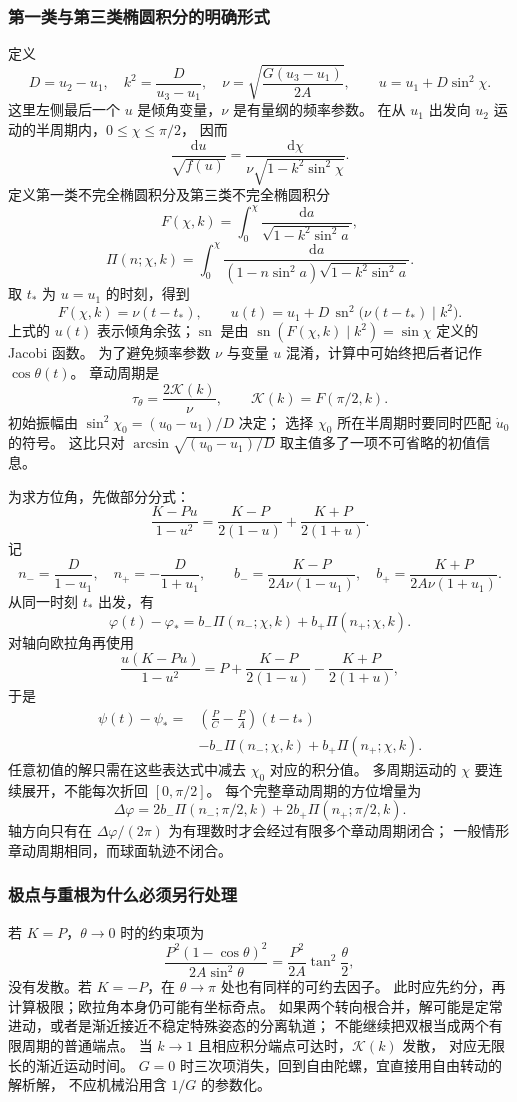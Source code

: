 \documentclass[UTF8,zihao=-4,fontset=fandol,a4paper]{ctexart}
\newcommand{\dd}{\mathrm d}
\begin{document}
\subsubsection*{第一类与第三类椭圆积分的明确形式}
定义
\[
D=u_2-u_1,\quad k^2=\frac{D}{u_3-u_1},\quad
\nu=\sqrt{\frac{G(u_3-u_1)}{2A}},\qquad
u=u_1+D\sin^2\chi.
\]
这里左侧最后一个 $u$ 是倾角变量，$\nu$ 是有量纲的频率参数。
在从 $u_1$ 出发向 $u_2$ 运动的半周期内，$0\le\chi\le\pi/2$，
因而
\[
\frac{\dd u}{\sqrt{f(u)}}
=\frac{\dd\chi}{\nu\sqrt{1-k^2\sin^2\chi}}.
\]
定义第一类不完全椭圆积分及第三类不完全椭圆积分
\[
F(\chi,k)=\int_0^\chi\frac{\dd a}{\sqrt{1-k^2\sin^2a}},
\]
\[
\Pi(n;\chi,k)=\int_0^\chi
\frac{\dd a}{(1-n\sin^2a)\sqrt{1-k^2\sin^2a}}.
\]
取 $t_*$ 为 $u=u_1$ 的时刻，得到
\[
F(\chi,k)=\nu(t-t_*),\qquad
u(t)=u_1+D\,\operatorname{sn}^2\bigl(\nu(t-t_*)\mid k^2\bigr).
\]
上式的 $u(t)$ 表示倾角余弦；$\operatorname{sn}$ 是由
$\operatorname{sn}(F(\chi,k)\mid k^2)=\sin\chi$ 定义的 Jacobi 函数。
为了避免频率参数 $\nu$ 与变量 $u$ 混淆，计算中可始终把后者记作 $\cos\theta(t)$。
章动周期是
\[
\tau_\theta=\frac{2\mathcal K(k)}{\nu},\qquad
\mathcal K(k)=F(\pi/2,k).
\]
初始振幅由 $\sin^2\chi_0=(u_0-u_1)/D$ 决定；
选择 $\chi_0$ 所在半周期时要同时匹配 $\dot u_0$ 的符号。
这比只对 $\arcsin\sqrt{(u_0-u_1)/D}$ 取主值多了一项不可省略的初值信息。

为求方位角，先做部分分式：
\[
\frac{K-Pu}{1-u^2}
=\frac{K-P}{2(1-u)}+\frac{K+P}{2(1+u)}.
\]
记
\[
n_-=\frac{D}{1-u_1},\quad n_+=-\frac{D}{1+u_1},\qquad
b_-=\frac{K-P}{2A\nu(1-u_1)},\quad
b_+=\frac{K+P}{2A\nu(1+u_1)}.
\]
从同一时刻 $t_*$ 出发，有
\[
\varphi(t)-\varphi_*
=b_-\Pi(n_-;\chi,k)+b_+\Pi(n_+;\chi,k).
\]
对轴向欧拉角再使用
\[
\frac{u(K-Pu)}{1-u^2}
=P+\frac{K-P}{2(1-u)}-\frac{K+P}{2(1+u)},
\]
于是
\[
\begin{aligned}
\psi(t)-\psi_*={}&\left(\frac PC-\frac PA\right)(t-t_*)\\
&-b_-\Pi(n_-;\chi,k)+b_+\Pi(n_+;\chi,k).
\end{aligned}
\]
任意初值的解只需在这些表达式中减去 $\chi_0$ 对应的积分值。
多周期运动的 $\chi$ 要连续展开，不能每次折回 $[0,\pi/2]$。
每个完整章动周期的方位增量为
\[
\Delta\varphi=2b_-\Pi(n_-;\pi/2,k)+2b_+\Pi(n_+;\pi/2,k).
\]
轴方向只有在 $\Delta\varphi/(2\pi)$ 为有理数时才会经过有限多个章动周期闭合；
一般情形章动周期相同，而球面轨迹不闭合。

\subsubsection*{极点与重根为什么必须另行处理}
若 $K=P$，$\theta\to0$ 时的约束项为
\[
\frac{P^2(1-\cos\theta)^2}{2A\sin^2\theta}
=\frac{P^2}{2A}\tan^2\frac\theta2,
\]
没有发散。若 $K=-P$，在 $\theta\to\pi$ 处也有同样的可约去因子。
此时应先约分，再计算极限；欧拉角本身仍可能有坐标奇点。
如果两个转向根合并，解可能是定常进动，或者是渐近接近不稳定特殊姿态的分离轨道；
不能继续把双根当成两个有限周期的普通端点。
当 $k\to1$ 且相应积分端点可达时，$\mathcal K(k)$ 发散，
对应无限长的渐近运动时间。
$G=0$ 时三次项消失，回到自由陀螺，宜直接用自由转动的解析解，
不应机械沿用含 $1/G$ 的参数化。
\end{document}
